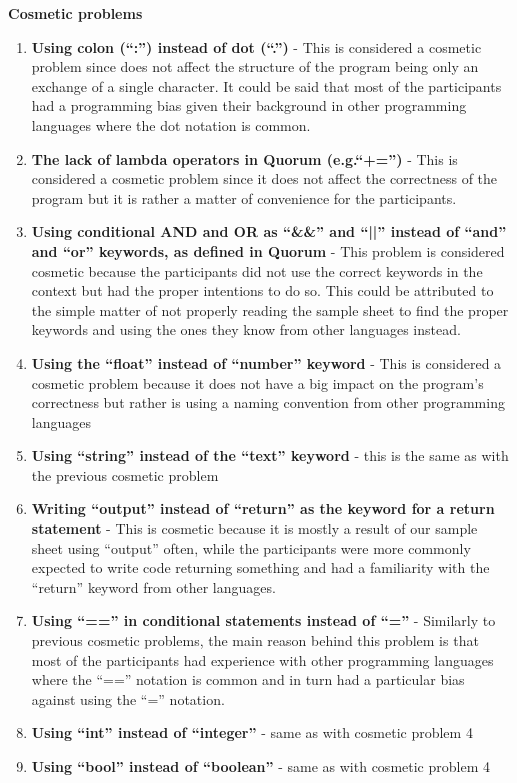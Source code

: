 \textbf{Cosmetic problems}
\begin{enumerate}
\item \textbf{Using colon (“:”) instead of dot (“.”)} - This is considered a cosmetic problem since does not affect the structure of the program being only an exchange of a single character. It could be said that most of the participants had a programming bias given their background in other programming languages where the dot notation is common.
\item \textbf{The lack of lambda operators in Quorum (e.g.“+=”)} - This is considered a cosmetic problem since it does not affect the correctness of the program but it is rather a matter of convenience for the participants.
\item \textbf{Using conditional AND and OR as “\&\&” and “||” instead of “and” and “or” keywords, as defined in Quorum}  - This problem is considered cosmetic because the participants did not use the correct keywords in the context but had the proper intentions to do so. This could be attributed to the simple matter of not properly reading the sample sheet to find the proper keywords and using the ones they know from other languages instead.
\item \textbf{Using the “float” instead of “number” keyword} - This is considered a cosmetic problem because it does not have a big impact on the program’s correctness but rather is using a naming convention from other programming languages
\item \textbf{Using “string” instead of the “text” keyword} - this is the same as with the previous cosmetic problem
\item \textbf{Writing “output” instead of “return” as the keyword for a return statement} - This is cosmetic because it is mostly a result of our sample sheet using “output” often, while the participants were more commonly expected to write code returning something and had a familiarity with the “return” keyword from other languages.
\item \textbf{Using “==” in conditional statements instead of “=”} - Similarly to previous cosmetic problems, the main reason behind this problem is that most of the participants had experience with other programming languages where the “==” notation is common and in turn had a particular bias against using the “=” notation.
\item \textbf{Using “int” instead of “integer”}  - same as with cosmetic problem 4
\item \textbf{Using “bool” instead of “boolean”} - same as with cosmetic problem 4

\end{enumerate}
